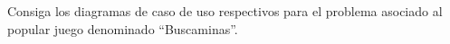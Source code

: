 Consiga los diagramas de caso de uso respectivos para el problema asociado al popular juego denominado “Buscaminas”.
